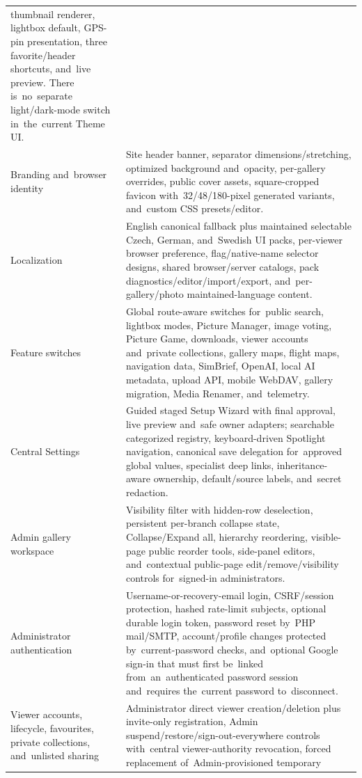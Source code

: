 \documentclass[11pt,a4paper]{article}
\begin{document}
\begin{longtable}{%
    >{\raggedright\arraybackslash}p{}%
    >{\raggedright\arraybackslash}p{}%
}
thumbnail renderer, lightbox default, GPS-pin presentation, three
favorite/header shortcuts, and~live preview. There is~no~separate
light/dark-mode switch in~the~current Theme UI.\\
Branding and~browser identity & Site header banner, separator
dimensions/stretching, optimized background and~opacity, per-gallery overrides,
public cover assets, square-cropped favicon with~32/48/180-pixel generated
variants, and~custom CSS presets/editor.\\
Localization & English canonical fallback plus maintained selectable Czech,
German, and~Swedish UI packs, per-viewer browser preference, flag/native-name
selector designs, shared browser/server catalogs, pack
diagnostics/editor/import/export, and~per-gallery/photo maintained-language
content.\\
Feature switches & Global route-aware switches for~public search, lightbox
modes, Picture Manager, image voting, Picture Game, downloads, viewer accounts
and~private collections, gallery maps, flight maps, navigation data, SimBrief,
OpenAI, local AI metadata, upload API, mobile WebDAV, gallery migration, Media
Renamer, and~telemetry.\\
Central Settings & Guided staged Setup Wizard with final approval, live preview
and~safe owner adapters; searchable categorized registry, keyboard-driven
Spotlight navigation, canonical save delegation for~approved global values,
specialist deep links, inheritance-aware ownership, default/source labels,
and~secret redaction.\\
Admin gallery workspace & Visibility filter with hidden-row deselection,
persistent per-branch collapse state, Collapse/Expand all, hierarchy reordering,
visible-page public reorder tools, side-panel editors, and~contextual
public-page edit/remove/visibility controls for~signed-in administrators.\\
Administrator authentication & Username-or-recovery-email login, CSRF/session
protection, hashed rate-limit subjects, optional durable login token, password
reset by~PHP mail/SMTP, account/profile changes protected by~current-password
checks, and~optional Google sign-in that must first be~linked
from~an~authenticated password session and~requires the~current password
to~disconnect.\\
Viewer accounts, lifecycle, favourites, private collections, and~unlisted
sharing & Administrator direct viewer creation/deletion plus invite-only
registration, Admin suspend/restore/sign-out-everywhere controls with~central
viewer-authority revocation, forced replacement of~Admin-provisioned temporary

\end{longtable}
\end{document}
